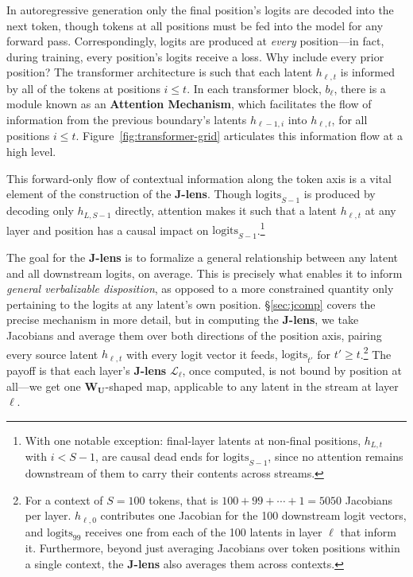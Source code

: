 \documentclass{article}
\newcommand{\logits}{\mathrm{logits}}
\newcommand{\jlens}{\mathscr{L}}
\begin{document}
In autoregressive generation only the final position's logits are decoded into the next token, though tokens at all positions must be fed into the model for any forward pass. Correspondingly, logits are produced at \textit{every} position---in fact, during training, every position's logits receive a loss. Why include every prior position? The transformer architecture is such that each latent \(h_{\ell, t}\) is informed by all of the tokens at positions \(i\le t\). In each transformer block, \(b_\ell\), there is a module known as an \textbf{Attention Mechanism}, which facilitates the flow of information from the previous boundary's latents \(h_{\ell-1, i}\) into \(h_{\ell, t}\), for all positions \(i \le t\). Figure~\ref{fig:transformer-grid} articulates this information flow at a high level.

This forward-only flow of contextual information along the token axis is a vital element of the construction of the \textbf{J-lens}. Though \(\logits_{S-1}\) is produced by decoding only \(h_{L, S-1}\) directly, attention makes it such that a latent \(h_{\ell, t}\) at any layer and position has a causal impact on \(\logits_{S-1}\).\footnote{With one notable exception: final-layer latents at non-final positions, \(h_{L, t}\) with \(i < S-1\), are causal dead ends for \(\logits_{S-1}\), since no attention remains downstream of them to carry their contents across streams.} 

The goal for the \textbf{J-lens} is to formalize a general relationship between any latent and all downstream logits, on average. This is precisely what enables it to inform \textit{general verbalizable disposition}, as opposed to a more constrained quantity only pertaining to the logits at any latent's own position. \S\ref{sec:jcomp} covers the precise mechanism in more detail, but in computing the \textbf{J-lens}, we take Jacobians and average them over both directions of the position axis, pairing every source latent \(h_{\ell,t}\) with every logit vector it feeds, \(\logits_{t'}\) for \(t' \ge t\).\footnote{For a context of \(S=100\) tokens, that is \(100 + 99 + \cdots + 1 = 5050\) Jacobians per layer. \(h_{\ell,0}\) contributes one Jacobian for the 100 downstream logit vectors, and \(\logits_{99}\) receives one from each of the 100 latents in layer \(\ell\) that inform it. Furthermore, beyond just averaging Jacobians over token positions within a single context, the \textbf{J-lens} also averages them across contexts.} The payoff is that each layer's \textbf{J-lens} $\jlens_\ell$, once computed, is not bound by position at all---we get one \(\mathbf{W_U}\)-shaped map, applicable to any latent in the stream at layer $\ell$. 
\end{document}
